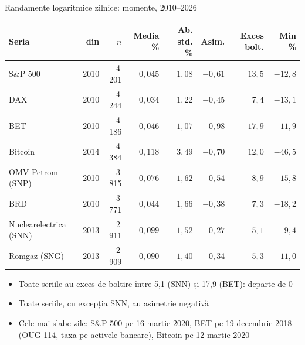 \begin{frame}{Randamente logaritmice zilnice: momente, 2010--2026}
\itemsize{\footnotesize}
\begin{center}
\footnotesize
\begin{tabular}{lrrrrrrr}
\toprule
Seria & din & $n$ & Media \% & Ab. std. \% & Asim. & Exces bolt. & Min \% \\
\midrule
S\&P 500 & 2010 & 4\,201 & $0{,}045$ & $1{,}08$ & $-0{,}61$ & $13{,}5$ & $-12{,}8$ \\
DAX & 2010 & 4\,244 & $0{,}034$ & $1{,}22$ & $-0{,}45$ & $7{,}4$ & $-13{,}1$ \\
BET & 2010 & 4\,186 & $0{,}046$ & $1{,}07$ & $-0{,}98$ & $17{,}9$ & $-11{,}9$ \\
Bitcoin & 2014 & 4\,384 & $0{,}118$ & $3{,}49$ & $-0{,}70$ & $12{,}0$ & $-46{,}5$ \\
OMV Petrom (SNP) & 2010 & 3\,815 & $0{,}076$ & $1{,}62$ & $-0{,}54$ & $8{,}9$ & $-15{,}8$ \\
BRD & 2010 & 3\,771 & $0{,}044$ & $1{,}66$ & $-0{,}38$ & $7{,}3$ & $-18{,}2$ \\
Nuclearelectrica (SNN) & 2013 & 2\,911 & $0{,}099$ & $1{,}52$ & $0{,}27$ & $5{,}1$ & $-9{,}4$ \\
Romgaz (SNG) & 2013 & 2\,909 & $0{,}090$ & $1{,}40$ & $-0{,}34$ & $5{,}3$ & $-11{,}0$ \\
\bottomrule
\end{tabular}
\end{center}
\begin{itemize}
    \item Toate seriile au exces de boltire între 5{,}1 (SNN) și 17{,}9 (BET): departe de 0
    \item Toate seriile, cu excepția SNN, au asimetrie negativă
    \item Cele mai slabe zile: S\&P 500 pe 16 martie 2020, BET pe 19 decembrie 2018 (OUG 114, taxa pe activele bancare), Bitcoin pe 12 martie 2020
\end{itemize}
\end{frame}

